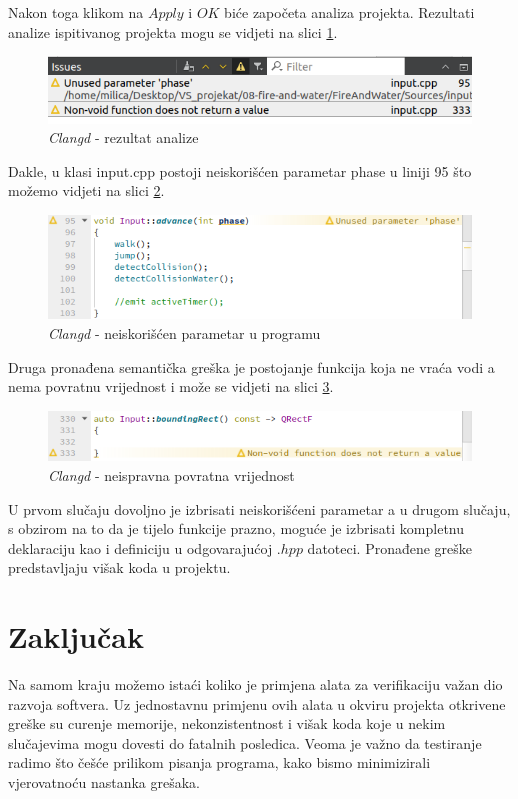 \documentclass[a4paper]{article}
\begin{document}
Nakon toga klikom na $Apply$ i $OK$ biće započeta analiza projekta. Rezultati analize ispitivanog projekta mogu se vidjeti na slici \ref{fig:c2}.
	\begin{figure}[h!]
		\centering
		\caption{\textit{Clangd} - rezultat analize}
		\label{fig:c2}
		\includegraphics[scale=0.5]{c2.png}
	\end{figure}
	
Dakle, u klasi input.cpp postoji neiskorišćen parametar phase u liniji 95 što možemo vidjeti na slici \ref{fig:c3}.
	\begin{figure}[h!]
		\caption{\textit{Clangd} - neiskorišćen parametar u programu}
		\label{fig:c3}
		\includegraphics[scale=0.6]{c3.png}
	\end{figure}
Druga pronađena semantička greška je postojanje funkcija koja ne vraća vodi a nema povratnu vrijednost i može se vidjeti na slici \ref{fig:c4}.
	 \begin{figure}[h!]
		\caption{\textit{Clangd} - neispravna povratna vrijednost}
		\label{fig:c4}
		\includegraphics[scale=0.6]{c4.png}
	\end{figure}
	
	U prvom slučaju dovoljno je izbrisati neiskorišćeni parametar a u drugom slučaju, s obzirom na to da je tijelo funkcije prazno, moguće je izbrisati kompletnu deklaraciju kao i definiciju u odgovarajućoj $.hpp$ datoteci. Pronađene greške predstavljaju višak koda u projektu.

\section{Zaključak}
\label{sec:zakljucak}
	
Na samom kraju možemo istaći koliko je primjena alata za verifikaciju važan dio razvoja softvera. Uz jednostavnu primjenu ovih alata u okviru projekta otkrivene greške su curenje memorije, nekonzistentnost i višak koda koje u nekim slučajevima mogu dovesti do fatalnih posledica. Veoma je važno da testiranje radimo što češće prilikom pisanja programa, kako bismo minimizirali vjerovatnoću nastanka grešaka. 
	

\newpage
{}
\appendix
 


	
\end{document}
